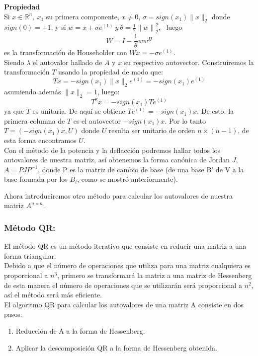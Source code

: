 \documentclass[12pt,a4paper]{article}
\begin{document}
\begin{multicols}{2}
	\noindent\textbf{Propiedad}\\
	\noindent Si $x \in\mathbb{R}^n, \ x_{1}$ su primera componente, $x\neq0$, $ \sigma=sign(x_{1})\|x\|_{2}$ donde $sign(0)=+1$, y si $w=x+\sigma e^{(1)} \ y \ \theta=\frac{1}{2}{\|w\|}^{2}_{2}$, \ luego $$W=I-\frac{1}{\theta}ww^{H}$$ es la transformación de Householder con $Wx=-\sigma e^{(1)}$.\\
	Siendo $\lambda$ el autovalor hallado de $A$ y $x$ su respectivo autovector. Construiremos la transformación $T$ usando la propiedad de modo que:  $$Tx=-sign(x_{1})\|x\|_{2}e^{(1)}=-sign(x_{1})e^{(1)}$$ asumiendo además $\|x\|_{2}=1$, luego:\\
	$$T^{2}x=-sign(x_{1})Te^{(1)}$$ya que $T$ es unitaria. De aquí se obtiene $Te^{(1)}=-sign(x_{1})x$. De esto, la primera columna de $T$ es el autovector $-sign(x_{1})x$. Por lo tanto $T=(-sign(x_{1})x,U)$ donde $U$ resulta ser unitario de orden $n\times(n-1)$, de esta forma encontramos $U$. \\
	
	\noindent Con el método de la potencia y la deflacción podremos hallar todos los autovalores de nuestra matriz, así obtenemos la forma canónica de Jordan $J$, $A=PJP^{-1}$, donde P es la matriz de cambio de base (de una base B' de V a la base formada por los $B_{i}$, como se mostró anteriormente).
	
	\noindent Ahora introduciremos otro método para calcular los autovalores de nuestra matriz $A^{n\times n}$.
	\subsubsection{Método QR:}
	\noindent El método QR es un método iterativo que consiste en reducir una matriz a una forma triangular.\\ Debido a que el número de operaciones que utiliza para una matriz cualquiera es proporcional a $n^3$, primero se transformará la matriz a una matriz de Hessenberg de esta manera el número de operaciones que se utilizarán será proporcional a $n^2$, así el método será más eficiente.\\
	
	\noindent El algoritmo QR para calcular los autovalores de una matriz A consiste en dos pasos:\\
	\begin{enumerate}
		\item Reducción de A a la forma de Hessenberg.
		\item Aplicar la descomposición QR a la forma de Hessenberg obtenida.
	\end{enumerate}
	

\end{multicols}
\end{document}
